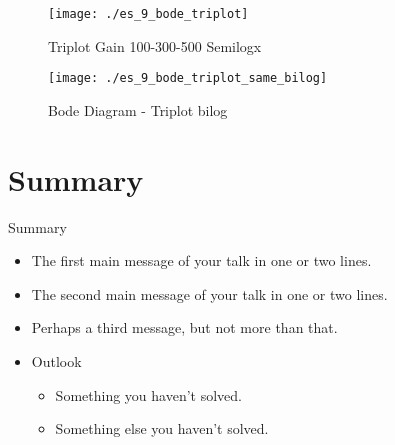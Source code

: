 \documentclass{beamer}
\begin{document}
\begin{frame}
\begin{figure}
\centering
\texttt{[image: ./es\_9\_bode\_triplot]}
\caption{Triplot Gain 100-300-500 Semilogx}
\label{fig:es_9_bode_triplot}
\end{figure}

\end{frame}

\begin{frame}
\begin{figure}
\centering
\texttt{[image: ./es\_9\_bode\_triplot\_same\_bilog]}
\caption{Bode Diagram - Triplot bilog}
\label{fig:es_9_bode_triplot_same_bilog}
\end{figure}

\end{frame}

\section*{Summary}

\begin{frame}{Summary}
  \begin{itemize}
  \item
    The \alert{first main message} of your talk in one or two lines.
  \item
    The \alert{second main message} of your talk in one or two lines.
  \item
    Perhaps a \alert{third message}, but not more than that.
  \end{itemize}
  
  \begin{itemize}
  \item
    Outlook
    \begin{itemize}
    \item
      Something you haven't solved.
    \item
      Something else you haven't solved.
    \end{itemize}
  \end{itemize}
\end{frame}



\appendix
\end{document}
